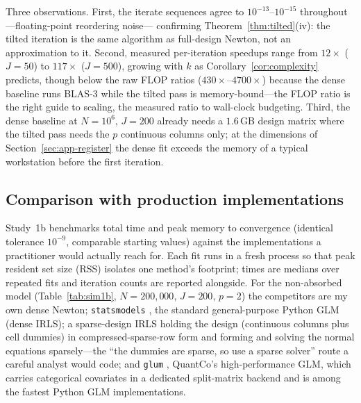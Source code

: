 \documentclass[11pt]{article}
\begin{document}
Three observations.  First, the iterate sequences agree to
$10^{-13}$--$10^{-15}$ throughout---floating-point reordering noise---%
confirming Theorem~\ref{thm:tilted}(iv): the tilted iteration is the
same algorithm as full-design Newton, not an approximation to it.
Second, measured per-iteration speedups range from
$12\times$ ($J = 50$) to $117\times$ ($J = 500$), growing with $k$ as
Corollary~\ref{cor:complexity} predicts, though below the raw FLOP ratios
($430\times$--$4700\times$) because the dense baseline runs
BLAS-3 while the tilted pass is memory-bound---the FLOP ratio is the
right guide to scaling, the measured ratio to wall-clock budgeting.
Third, the dense baseline at $N = 10^6$, $J = 200$ already needs a
$1.6$\,GB design matrix where the tilted pass needs the $p$ continuous
columns only; at the dimensions of Section~\ref{sec:app-register} the
dense fit exceeds the memory of a typical workstation before the first
iteration.



\subsection{Comparison with production implementations}
\label{sec:sim-baselines}

Study~1b benchmarks total time and peak memory to convergence (identical
tolerance $10^{-9}$, comparable starting values) against the
implementations a practitioner would actually reach for.  Each fit runs
in a fresh process so that peak resident set size (RSS) isolates one
method's footprint; times are medians over repeated fits and iteration
counts are reported alongside.  For the non-absorbed model
(Table~\ref{tab:sim1b}, $N = 200{,}000$, $J = 200$, $p = 2$) the
competitors are my own dense Newton; \texttt{statsmodels}
\citep{seabold2010}, the standard general-purpose Python GLM (dense
IRLS); a sparse-design IRLS holding the design (continuous columns plus
cell dummies) in compressed-sparse-row form and forming and solving the
normal equations sparsely---the ``the dummies are sparse, so use a
sparse solver'' route a careful analyst would code; and \texttt{glum}
\citep{tabmat2021}, QuantCo's high-performance GLM, which carries
categorical covariates in a dedicated split-matrix backend and is among
the fastest Python GLM implementations.
\end{document}
